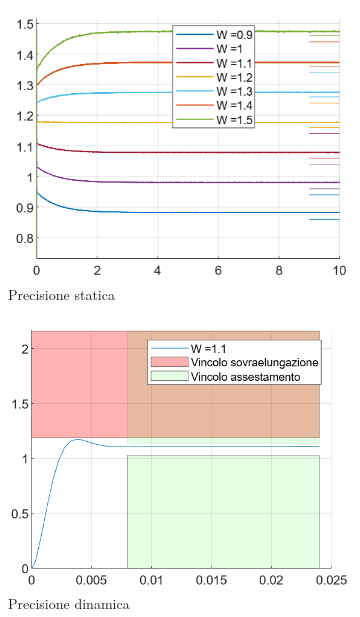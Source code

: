 \documentclass[a4paper, 11pt]{article}
\begin{document}
\begin{figure}[h!]
	\centering
	\begin{subfigure}[b]{0.3\textwidth}
		\centering
		\includegraphics[width=\textwidth]{./images/gradini_statico.png}
		\caption{Precisione statica}
		\label{fig:gradini_statico}
	\end{subfigure}
	\begin{subfigure}[b]{0.3\textwidth}
		\centering
		\includegraphics[width=\textwidth]{./images/gradini_dinamico_low.png}
		\caption{Precisione dinamica}
		\label{fig:gradini_dinamico_low}
	\end{subfigure}
	\begin{subfigure}[b]{0.3\textwidth}

\end{subfigure}
\end{figure}
\end{document}
